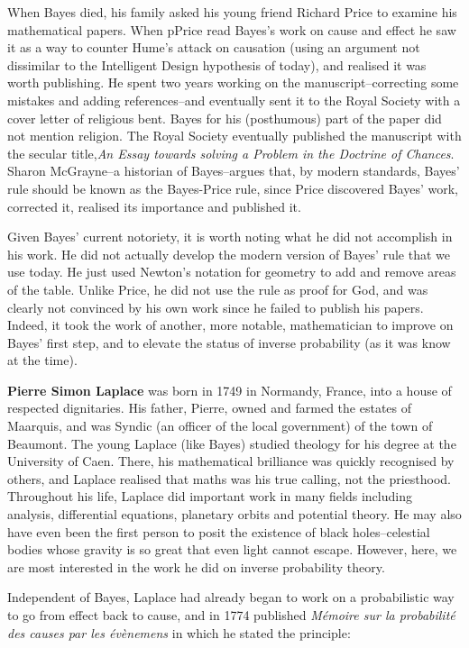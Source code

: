 \documentclass[a4paper,11pt]{apa7}
\begin{document}
When Bayes died, his family asked his young friend Richard Price to examine his mathematical papers. When pPrice read Bayes's work on cause and effect he saw it as a way to counter Hume's attack on causation (using an argument not dissimilar to the Intelligent Design hypothesis of today), and realised it was worth publishing. He spent two years working on the manuscript--correcting some mistakes and adding references--and eventually sent it to the Royal Society with a cover letter of religious bent. Bayes for his (posthumous) part of the paper did not mention religion. The Royal Society eventually published the manuscript with the secular title,\textit{An Essay towards solving a Problem in the Doctrine of Chances}. Sharon McGrayne--a historian of Bayes--argues that, by modern standards, Bayes' rule should be known as the Bayes-Price rule, since Price discovered Bayes' work, corrected it, realised its importance and published it.

Given Bayes' current notoriety, it is worth noting what he did not accomplish in his work. He did not actually develop the modern version of Bayes' rule that we use today. He just used Newton's notation for geometry to add and remove areas of the table. Unlike Price, he did not use the rule as proof for God, and was clearly not convinced by his own work since he failed to publish his papers. Indeed, it took the work of another, more notable, mathematician to improve on Bayes' first step, and to elevate the status of inverse probability (as it was know at the time).

\textbf{Pierre Simon Laplace} was born in 1749 in Normandy, France, into a house of respected dignitaries. His father, Pierre, owned and farmed the estates of Maarquis, and was Syndic (an officer of the local government) of the town of Beaumont. The young Laplace (like Bayes) studied theology for his degree at the University of Caen. There, his mathematical brilliance was quickly recognised by others, and Laplace realised that maths was his true calling, not the priesthood. Throughout his life, Laplace did important work in many fields including analysis, differential equations, planetary orbits and potential theory. He may also have even been the first person to posit the existence of black holes--celestial bodies whose gravity is so great that even light cannot escape. However, here, we are most interested in the work he did on inverse probability theory.

Independent of Bayes, Laplace had already began to work on a probabilistic way to go from effect back to cause, and in 1774 published \textit{M{\'e}moire sur la probabilit{\'e} des causes par les {\'e}v{\`e}nemens} in which he stated the principle:
\end{document}
